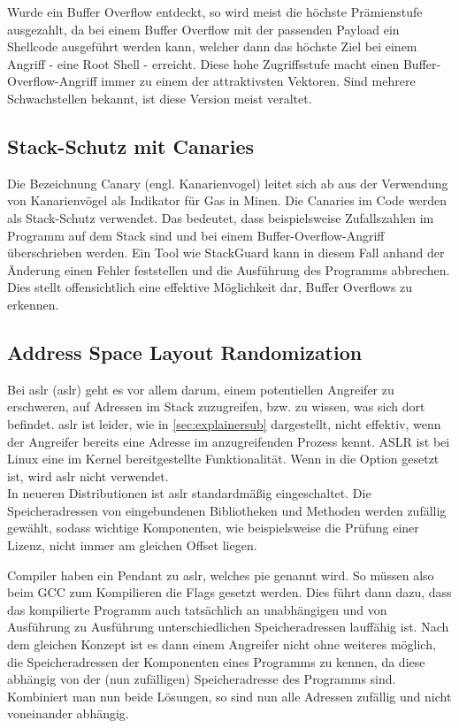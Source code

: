 Wurde ein Buffer Overflow entdeckt, so wird meist die höchste Prämienstufe ausgezahlt, da bei einem
Buffer Overflow mit der passenden Payload ein Shellcode ausgeführt werden kann, welcher dann das
höchste Ziel bei einem Angriff - eine Root Shell - erreicht.
Diese hohe Zugriffsstufe macht einen Buffer-Overflow-Angriff immer zu einem der attraktivsten Vektoren. 
Sind mehrere Schwachstellen bekannt, ist diese Version meist veraltet. 

\pagebreak
\subsection{Stack-Schutz mit Canaries} \label{sec:canaries}
Die Bezeichnung Canary (engl. Kanarienvogel) leitet sich ab aus der Verwendung von Kanarienvögel als
Indikator für Gas in Minen. Die Canaries im Code werden als Stack-Schutz verwendet. Das bedeutet,
dass beispielsweise Zufallszahlen im Programm auf dem Stack sind und bei einem Buffer-Overflow-Angriff
überschrieben werden. Ein Tool wie StackGuard kann in diesem Fall anhand der Änderung einen Fehler feststellen und
die Ausführung des Programms abbrechen. Dies stellt offensichtlich eine effektive Möglichkeit dar,
Buffer Overflows zu erkennen.

\subsection{Address Space Layout Randomization} \label{sec:aslr}
Bei \acrlong*{aslr} (\acrshort*{aslr}) geht es vor allem darum, einem potentiellen Angreifer zu erschweren,
auf Adressen im Stack zuzugreifen, bzw. zu wissen, was sich dort befindet.
\gls*{aslr} ist leider, wie in \autoref{sec:explainersub} dargestellt, nicht effektiv, wenn der Angreifer
bereits eine Adresse im anzugreifenden Prozess kennt.
ASLR ist bei Linux eine im Kernel bereitgestellte Funktionalität.
Wenn in  die Option  gesetzt ist,
wird \gls*{aslr}  nicht verwendet. \cite{aslrandrew} \\
In neueren Distributionen ist \gls*{aslr} standardmäßig eingeschaltet.
Die Speicheradressen von eingebundenen Bibliotheken und Methoden werden
zufällig gewählt, sodass wichtige Komponenten, wie beispielsweise die
Prüfung einer Lizenz, nicht immer am gleichen Offset liegen.

Compiler haben ein Pendant zu \gls*{aslr}, welches \gls*{pie}
genannt wird. So müssen also beim GCC zum Kompilieren die Flags 
gesetzt werden. Dies führt dann dazu, dass das kompilierte Programm auch tatsächlich an
unabhängigen und von Ausführung zu Ausführung unterschiedlichen Speicheradressen lauffähig
ist.
Nach dem gleichen Konzept ist es dann einem Angreifer nicht ohne weiteres möglich, die
Speicheradressen der Komponenten eines Programms zu kennen, da diese abhängig
von der (nun zufälligen) Speicheradresse des Programms sind. Kombiniert man nun beide Lösungen,
so sind nun alle Adressen zufällig und nicht voneinander abhängig.


